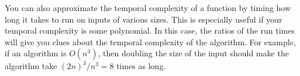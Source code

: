 You can also approximate the temporal complexity of a function by timing how long it takes to run on inputs of various sizes. This is especially useful if your temporal complexity is some polynomial. In this case, the ratios of the run times will give you clues about the temporal complexity of the algorithm. For example, if an algorithm is $O(n^3)$, then doubling the size of the input should make the algorithm take $(2n)^3/n^3=8$ times as long.

